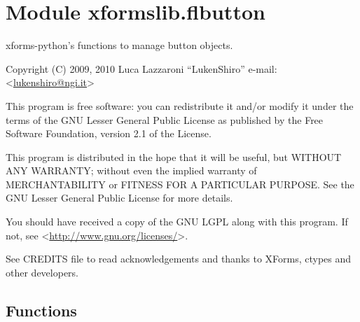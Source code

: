 %
%
%


\section{Module xformslib.flbutton}

    \label{xformslib:flbutton}

xforms-python's functions to manage button objects.

Copyright (C) 2009, 2010  Luca Lazzaroni ``LukenShiro''
e-mail: <\href{mailto:lukenshiro@ngi.it}{lukenshiro@ngi.it}>

This program is free software: you can redistribute it and/or modify
it under the terms of the GNU Lesser General Public License as
published by the Free Software Foundation, version 2.1 of the License.

This program is distributed in the hope that it will be useful,
but WITHOUT ANY WARRANTY; without even the implied warranty of
MERCHANTABILITY or FITNESS FOR A PARTICULAR PURPOSE. See the
GNU Lesser General Public License for more details.

You should have received a copy of the GNU LGPL along with this
program. If not, see <\href{http://www.gnu.org/licenses/}{http://www.gnu.org/licenses/}>.

See CREDITS file to read acknowledgements and thanks to XForms,
ctypes and other developers.


  \subsection{Functions}

    \label{xformslib:flbutton:fl_add_roundbutton}

